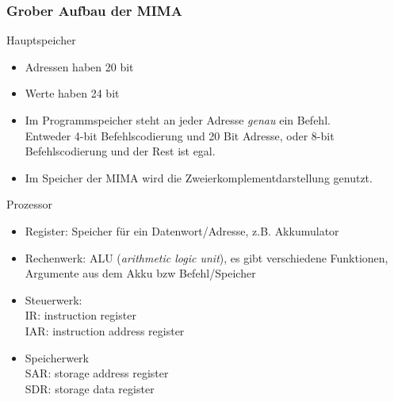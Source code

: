\documentclass{article}
\newcommand{\important}[1]{\textcolor{importantColor}{#1}}
\begin{document}
\subsubsection{Grober Aufbau der MIMA}
Hauptspeicher
\begin{itemize}
    \item \important{Adressen} haben \important{20 bit}
    \item \important{Werte} haben \important{24 bit}
    \item Im \important{Programmspeicher} steht an jeder Adresse \textit{genau} ein Befehl.\\
    Entweder 4-bit Befehlscodierung und 20 Bit Adresse, oder 8-bit Befehlscodierung und der Rest ist egal.
    \item Im Speicher der MIMA wird die Zweierkomplementdarstellung genutzt.
\end{itemize}
Prozessor
\begin{itemize}
    \item \important{Register}: Speicher für ein Datenwort/Adresse, z.B. \important{Akku}mulator
    \item \important{Rechenwerk}: \important{ALU} (\textit{arithmetic logic unit}), es gibt verschiedene Funktionen, Argumente aus dem \important{Akku} bzw Befehl/Speicher
    \item \important{Steuerwerk}:\\
    \important{IR}: instruction register\\
    \important{IAR}: instruction address register
    \item \important{Speicherwerk}\\
    \important{SAR}: storage address register\\
    \important{SDR}: storage data register
\end{itemize}
\end{document}

